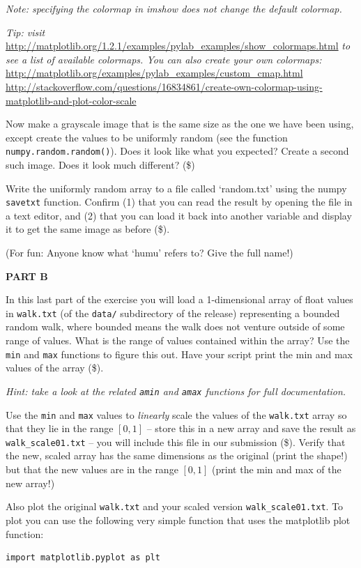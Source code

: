 \documentclass[10pt]{article}
\begin{document}
\begin{enumerate}
{\em Note: specifying the colormap in imshow does not change the default colormap.}

{\em Tip: visit} \url{http://matplotlib.org/1.2.1/examples/pylab_examples/show_colormaps.html} {\em to see a list of available colormaps.  You can also create your own colormaps:}\\
\url{http://matplotlib.org/examples/pylab_examples/custom_cmap.html}\\
\url{http://stackoverflow.com/questions/16834861/create-own-colormap-using-matplotlib-and-plot-color-scale}

Now make a grayscale image that is the same size as the one we have been using, except create the values to be uniformly random (see the function {\tt numpy.random.random()}).  Does it look like what you expected?  Create a second such image.  Does it look much different? (\$)

Write the uniformly random array to a file called `random.txt' using the numpy {\tt savetxt} function.  Confirm (1) that you can read the result by opening the file in a text editor, and (2) that you can load it back into another variable and display it to get the same image as before (\$).

(For fun: Anyone know what `humu' refers to?  Give the full name!)

\textbf{PART B}

In this last part of the exercise you will load a 1-dimensional array of float values in {\tt walk.txt} (of the {\tt data/} subdirectory of the release) representing a bounded random walk, where bounded means the walk does not venture outside of some range of values.  What is the range of values contained within the array?  Use the {\tt min} and {\tt max} functions to figure this out.  Have your script print the min and max values of the array (\$).

{\em Hint: take a look at the related {\tt amin} and {\tt amax} functions for full documentation.}

Use the {\tt min} and {\tt max} values to {\em linearly} scale the values of the {\tt walk.txt} array so that they lie in the range $[0, 1]$ -- store this in a new array and save the result as {\tt walk\_scale01.txt} -- you will include this file in our submission (\$).  Verify that the new, scaled array has the same dimensions as the original (print the shape!) but that the new values are in the range $[0, 1]$ (print the min and max of the new array!) 

Also plot the original {\tt walk.txt} and your scaled version {\tt walk\_scale01.txt}.  To plot you can use the following very simple function that uses the matplotlib plot function:
\begin{verbatim}
import matplotlib.pyplot as plt


\end{verbatim}
\end{enumerate}
\end{document}

